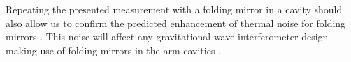 
Repeating the presented measurement with a folding mirror in a cavity should also allow us to confirm the predicted enhancement of thermal noise for folding mirrors \cite{PhysRevD.90.042001} . This noise will affect any gravitational-wave interferometer design making use of folding mirrors in the arm cavities \cite{Ballmer13}.







%
%

